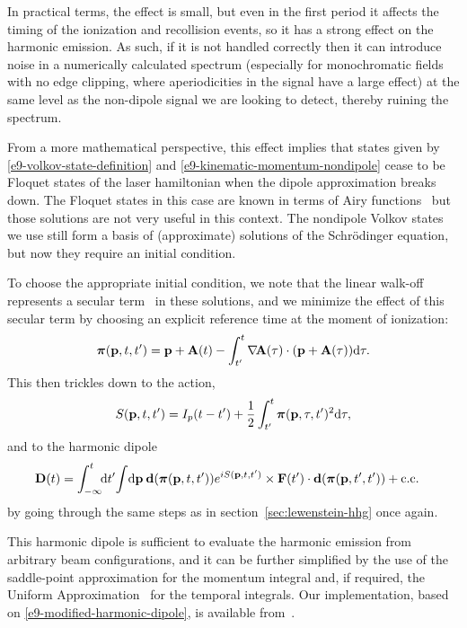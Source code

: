 In practical terms, the effect is small, but even in the first period it affects the timing of the ionization and recollision events, so it has a strong effect on the harmonic emission. As such, if it is not handled correctly then it can introduce noise in a numerically calculated spectrum (especially for monochromatic fields with no edge clipping, where aperiodicities in the signal have a large effect) at the same level as the non-dipole signal we are looking to detect, thereby ruining the spectrum.




From a more mathematical perspective, this effect implies that states given by \eqref{e9-volkov-state-definition} and \eqref{e9-kinematic-momentum-nondipole} cease to be Floquet states of the laser hamiltonian when the dipole approximation breaks down. The Floquet states in this case are known in terms of Airy functions~\cite{Li-Reichl-Floquet} but those solutions are not very useful in this context. The nondipole Volkov states we use still form a basis of (approximate) solutions of the Schrödinger equation, but now they require an initial condition.




To choose the appropriate initial condition, we note that the linear walk-off represents a secular term~\cite{Nayfeh_secular_terms} in these solutions, and we minimize the effect of this secular term by choosing an explicit reference time at the moment of ionization:
\begin{equation}
\boldsymbol{\pi}(\vb{p},t,t')=\vb{p}+\vb{A}(t)-\int_{t'}^t \nabla\!\vb{A}(\tau) \cdot (\vb{p}+\vb{A}(\tau))\mathrm{d}\tau.
\label{e9-modified-kinematic-momentum-nondipole}
\end{equation}
This then trickles down to the action,
\begin{equation}
S(\vb{p},t,t')=I_p(t-t')+\frac12 \int_{t'}^t \boldsymbol{\pi}(\vb{p},\tau,t')^2\mathrm{d}\tau,
\label{e9-modified-action}
\end{equation}
and to the harmonic dipole
\begin{align}
\vb D(t)
=
\int_{-\infty}^t \!\!\mathrm{d} t'\!
\int\!\mathrm{d}\vb{p}\:
&
\vb{d}(\boldsymbol{\pi}(\vb{p},t,t'))
e^{iS(\vb{p},t,t')}
\times\vb{F}(t')\cdot\vb{d}(\boldsymbol{\pi}(\vb{p},t',t'))
+\mathrm{c.c.}
\label{e9-modified-harmonic-dipole}
\end{align}
by going through the same steps as in section~\ref{sec:lewenstein-hhg} once again.
 
This harmonic dipole is sufficient to evaluate the harmonic emission from arbitrary beam configurations, and it can be further simplified by the use of the saddle-point approximation for the momentum integral and, if required, the Uniform Approximation~\cite{figueira_uniform-approximation_2002, milosevic_long-quantum-orbits_2002} for the temporal integrals. Our implementation, based on \eqref{e9-modified-harmonic-dipole}, is available from~.









